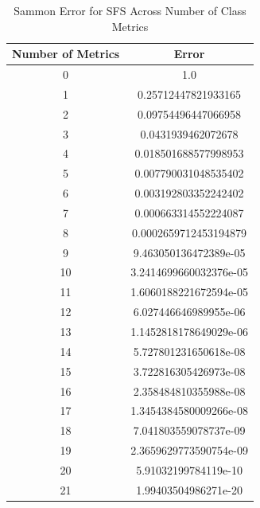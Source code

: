 \begin{table}[H]
\centering
\caption{Sammon Error for SFS Across Number of Class Metrics}
\label{tab:sfs_class}
\begin{tabular}{|c|c|}
\hline
\textbf{Number of Metrics} & \textbf{Error} \\ \hline
0 & 1.0 \\ \hline
1 & 0.25712447821933165 \\ \hline
2 & 0.09754496447066958 \\ \hline
3 & 0.0431939462072678 \\ \hline
4 & 0.018501688577998953 \\ \hline
5 & 0.007790031048535402 \\ \hline
6 & 0.003192803352242402 \\ \hline
7 & 0.000663314552224087 \\ \hline
8 & 0.0002659712453194879 \\ \hline
9 & 9.463050136472389e-05 \\ \hline
10 & 3.2414699660032376e-05 \\ \hline
11 & 1.6060188221672594e-05 \\ \hline
12 & 6.027446646989955e-06 \\ \hline
13 & 1.1452818178649029e-06 \\ \hline
14 & 5.727801231650618e-08 \\ \hline
15 & 3.722816305426973e-08 \\ \hline
16 & 2.358484810355988e-08 \\ \hline
17 & 1.3454384580009266e-08 \\ \hline
18 & 7.041803559078737e-09 \\ \hline
19 & 2.3659629773590754e-09 \\ \hline
20 & 5.91032199784119e-10 \\ \hline
21 & 1.99403504986271e-20 \\ \hline
\end{tabular}
\end{table}

